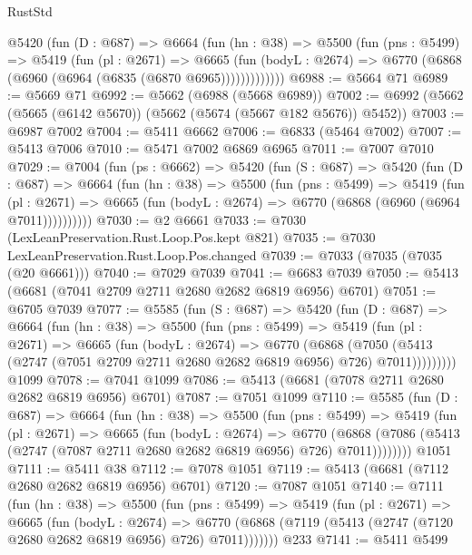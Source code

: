 \begin{lexlean}{RustStd}
\begin{coremodule}
        @5420
          (fun (D : @687) =>
          @6664
            (fun (hn : @38) =>
            @5500
              (fun (pns : @5499) =>
              @5419
                (fun (pl : @2671) =>
                @6665
                  (fun (bodyL : @2674) =>
                  @6770 (@6868 (@6960 (@6964 (@6835 (@6870 @6965)))))))))))))
@6988 := @5664 @71
@6989 := @5669 @71
@6992 := @5662 (@6988 (@5668 @6989))
@7002 := @6992 (@5662 (@5665 (@6142 @5670)) (@5662 (@5674 (@5667 @182 @5676)) @5452))
@7003 := @6987 @7002
@7004 := @5411 @6662
@7006 := @6833 (@5464 @7002)
@7007 := @5413 @7006
@7010 := @5471 @7002 @6869 @6965
@7011 := @7007 @7010
@7029 := @7004
    (fun (ps : @6662) =>
    @5420
      (fun (S : @687) =>
      @5420
        (fun (D : @687) =>
        @6664
          (fun (hn : @38) =>
          @5500
            (fun (pns : @5499) =>
            @5419
              (fun (pl : @2671) =>
              @6665 (fun (bodyL : @2674) => @6770 (@6868 (@6960 (@6964 @7011))))))))))
@7030 := @2 @6661
@7033 := @7030 (LexLeanPreservation.Rust.Loop.Pos.kept @821)
@7035 := @7030 LexLeanPreservation.Rust.Loop.Pos.changed
@7039 := @7033 (@7035 (@7035 (@20 @6661)))
@7040 := @7029 @7039
@7041 := @6683 @7039
@7050 := @5413 (@6681 (@7041 @2709 @2711 @2680 @2682 @6819 @6956) @6701)
@7051 := @6705 @7039
@7077 := @5585
    (fun (S : @687) =>
    @5420
      (fun (D : @687) =>
      @6664
        (fun (hn : @38) =>
        @5500
          (fun (pns : @5499) =>
          @5419
            (fun (pl : @2671) =>
            @6665
              (fun (bodyL : @2674) =>
              @6770
                (@6868
                  (@7050
                    (@5413 (@2747 (@7051 @2709 @2711 @2680 @2682 @6819 @6956) @726) @7011)))))))))
    @1099
@7078 := @7041 @1099
@7086 := @5413 (@6681 (@7078 @2711 @2680 @2682 @6819 @6956) @6701)
@7087 := @7051 @1099
@7110 := @5585
    (fun (D : @687) =>
    @6664
      (fun (hn : @38) =>
      @5500
        (fun (pns : @5499) =>
        @5419
          (fun (pl : @2671) =>
          @6665
            (fun (bodyL : @2674) =>
            @6770
              (@6868 (@7086 (@5413 (@2747 (@7087 @2711 @2680 @2682 @6819 @6956) @726) @7011))))))))
    @1051
@7111 := @5411 @38
@7112 := @7078 @1051
@7119 := @5413 (@6681 (@7112 @2680 @2682 @6819 @6956) @6701)
@7120 := @7087 @1051
@7140 := @7111
    (fun (hn : @38) =>
    @5500
      (fun (pns : @5499) =>
      @5419
        (fun (pl : @2671) =>
        @6665
          (fun (bodyL : @2674) =>
          @6770 (@6868 (@7119 (@5413 (@2747 (@7120 @2680 @2682 @6819 @6956) @726) @7011)))))))
    @233
@7141 := @5411 @5499

\end{coremodule}
\end{lexlean}
